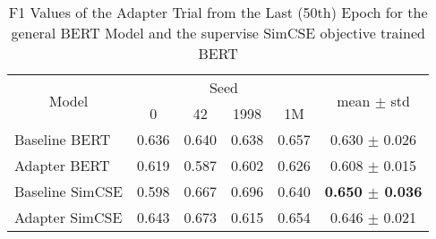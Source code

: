 \begin{table}[h]
    \centering
    \caption{F1 Values of the Adapter Trial from the Last (50th) Epoch for the general BERT Model and
             the supervise SimCSE objective trained BERT}
    \label{tab:my-table}
    \begin{tabular}{|l||cccc|c|}
    \hline
    \multicolumn{1}{|c||}{\multirow{2}{*}{Model}} & \multicolumn{4}{c|}{Seed}                                                                    & \multirow{2}{*}{mean $\pm$ std} \\ \cline{2-5}
    \multicolumn{1}{|c||}{}                       & \multicolumn{1}{c|}{0}     & \multicolumn{1}{c|}{42}    & \multicolumn{1}{c|}{1998}  & 1M    &                                 \\ \hline\hline
    Baseline BERT                                 & \multicolumn{1}{c|}{0.636} & \multicolumn{1}{c|}{0.640} & \multicolumn{1}{c|}{0.638} & 0.657 & 0.630 $\pm$ 0.026               \\ \hline
    Adapter BERT                                  & \multicolumn{1}{c|}{0.619} & \multicolumn{1}{c|}{0.587} & \multicolumn{1}{c|}{0.602} & 0.626 & 0.608 $\pm$ 0.015               \\ \hline
    Baseline SimCSE                               & \multicolumn{1}{c|}{0.598} & \multicolumn{1}{c|}{0.667} & \multicolumn{1}{c|}{0.696} & 0.640 & \textbf{0.650 $\pm$ 0.036}               \\ \hline
    Adapter SimCSE                                & \multicolumn{1}{c|}{0.643} & \multicolumn{1}{c|}{0.673} & \multicolumn{1}{c|}{0.615} & 0.654 & 0.646 $\pm$ 0.021      \\ \hline
    \end{tabular}
\end{table}

